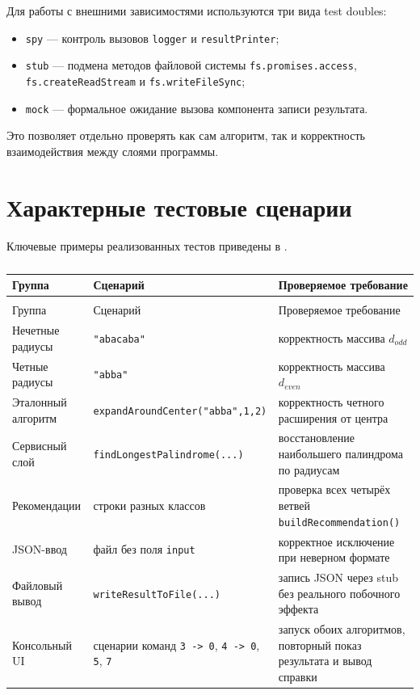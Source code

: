 Для работы с внешними зависимостями используются три вида test doubles:
\begin{itemize}
    \item \texttt{spy} --- контроль вызовов \texttt{logger} и \texttt{resultPrinter};
    \item \texttt{stub} --- подмена методов файловой системы \texttt{fs.promises.access}, \texttt{fs.createReadStream} и \texttt{fs.writeFileSync};
    \item \texttt{mock} --- формальное ожидание вызова компонента записи результата.
\end{itemize}

Это позволяет отдельно проверять как сам алгоритм, так и корректность взаимодействия между слоями программы.

\section{Характерные тестовые сценарии} \label{ch4:sec5}

Ключевые примеры реализованных тестов приведены в .

\noindent
\begingroup
\centering
\small
\begin{longtable}[c]{|p{3.2cm}|p{4.7cm}|p{7.1cm}|}
    \caption{Характерные сценарии модульных тестов}
    \label{tab:test-examples}
    \\
    \hline
    Группа & Сценарий & Проверяемое требование \\ \hline
    \endfirsthead
    \captionsetup{format=tablenocaption,labelformat=continued}
    \caption[]{}\\
    \hline
    Группа & Сценарий & Проверяемое требование \\ \hline
    \endhead
    \hline
    \endfoot
    \hline
    \endlastfoot
    Нечетные радиусы & \texttt{"abacaba"} & корректность массива $d_{odd}$ \\ \hline
    Четные радиусы & \texttt{"abba"} & корректность массива $d_{even}$ \\ \hline
    Эталонный алгоритм & \texttt{expandAroundCenter("abba",1,2)} & корректность четного расширения от центра \\ \hline
    Сервисный слой & \texttt{findLongestPalindrome(...)} & восстановление наибольшего палиндрома по радиусам \\ \hline
    Рекомендации & строки разных классов & проверка всех четырёх ветвей \texttt{buildRecommendation()} \\ \hline
    JSON-ввод & файл без поля \texttt{input} & корректное исключение при неверном формате \\ \hline
    Файловый вывод & \texttt{writeResultToFile(...)} & запись JSON через stub без реального побочного эффекта \\ \hline
    Консольный UI & сценарии команд \texttt{3 -> 0}, \texttt{4 -> 0}, \texttt{5}, \texttt{7} & запуск обоих алгоритмов, повторный показ результата и вывод справки \\ \hline
\end{longtable}
\normalsize
\endgroup

